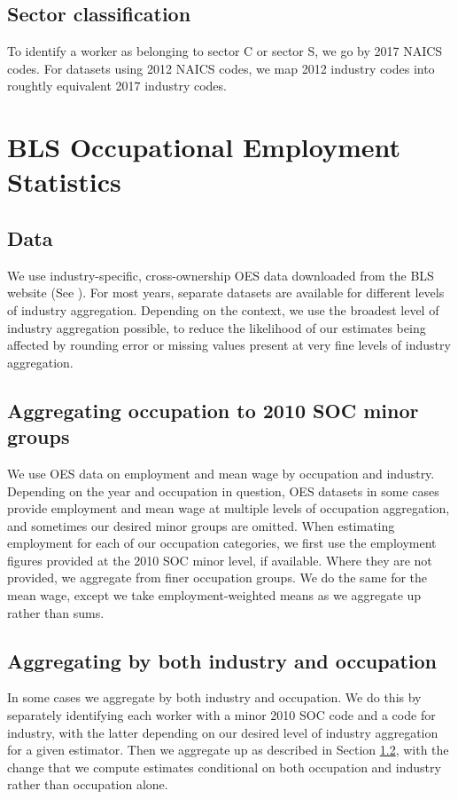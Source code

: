 \documentclass{article}
\begin{document}
\subsection{Sector classification}
To identify a worker as belonging to sector C or sector S, we go by 2017 NAICS codes. For datasets using 2012 NAICS codes, we map 2012 industry codes into roughtly equivalent 2017 industry codes.

\section{BLS Occupational Employment Statistics}
\subsection{Data}
We use industry-specific, cross-ownership OES data downloaded from the BLS website (See \cite{OES}). For most years, separate datasets are available for different levels of industry aggregation. Depending on the context, we use the broadest level of industry aggregation possible, to reduce the likelihood of our estimates being affected by rounding error or missing values present at very fine levels of industry aggregation. 

\subsection{Aggregating occupation to 2010 SOC minor groups}
\label{OES: aggregation}
We use OES data on employment and mean wage by occupation and industry.
Depending on the year and occupation in question, OES datasets in some cases provide employment and mean wage at multiple levels of occupation aggregation, and sometimes our desired minor groups are omitted.
When estimating employment for each of our occupation categories, we first use the employment figures provided at the 2010 SOC minor level, if available. Where they are not provided, we aggregate from finer occupation groups. We do the same for the mean wage, except we take employment-weighted means as we aggregate up rather than sums.

\subsection{Aggregating by both industry and occupation}
In some cases we aggregate by both industry and occupation. We do this by separately identifying each worker with a minor 2010 SOC code and a code for industry, with the latter depending on our desired level of industry aggregation for a given estimator. Then we aggregate up as described in Section \ref{OES: aggregation}, with the change that we compute estimates conditional on both occupation and industry rather than occupation alone.
\end{document}
